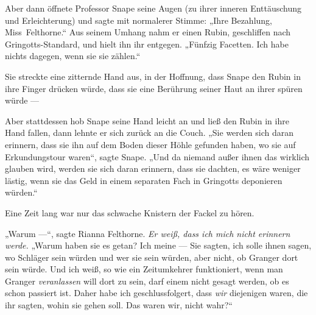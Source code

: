 Aber dann öffnete Professor Snape seine Augen (zu ihrer inneren Enttäuschung und Erleichterung) und sagte mit normalerer Stimme:
„Ihre Bezahlung, Miss~Felthorne.“ Aus seinem Umhang nahm er einen Rubin, geschliffen nach Gringotts-Standard, und hielt ihn ihr entgegen.
„Fünfzig Facetten. Ich habe nichts dagegen, wenn sie sie zählen.“

Sie streckte eine zitternde Hand aus, in der Hoffnung, dass Snape den Rubin in ihre Finger drücken würde, dass sie eine Berührung seiner Haut an ihrer spüren würde —

Aber stattdessen hob Snape seine Hand leicht an und ließ den Rubin in ihre Hand fallen, dann lehnte er sich zurück an die Couch.
„Sie werden sich daran erinnern, dass sie ihn auf dem Boden dieser Höhle gefunden haben, wo sie auf Erkundungstour waren“, sagte Snape.
„Und da niemand außer ihnen das wirklich glauben wird, werden sie sich daran erinnern, dass sie dachten, es wäre weniger lästig, wenn sie das Geld in einem separaten Fach in Gringotts deponieren würden.“

Eine Zeit lang war nur das schwache Knistern der Fackel zu hören.

„Warum —“, sagte Rianna Felthorne. \emph{Er weiß, dass ich mich nicht erinnern werde.}
„Warum haben sie es getan? Ich meine — Sie sagten, ich solle ihnen sagen, wo Schläger sein würden und wer sie sein würden, aber nicht, ob Granger dort sein würde. Und ich weiß, so wie ein Zeitumkehrer funktioniert, wenn man Granger \emph{veranlassen} will dort zu sein, darf einem nicht gesagt werden, ob es schon passiert ist. Daher habe ich geschlussfolgert, dass \emph{wir} diejenigen waren, die ihr sagten, wohin sie gehen soll. Das waren wir, nicht wahr?“

